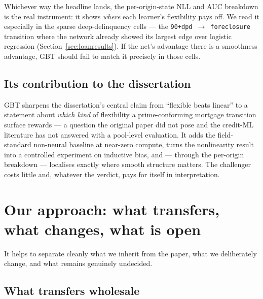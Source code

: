 \documentclass[11pt]{article}
\newcommand{\state}[1]{\texttt{#1}}
\begin{document}
\begin{keyidea}
Whichever way the headline lands, the per-origin-state NLL and AUC breakdown is the real
instrument: it shows \emph{where} each learner's flexibility pays off. We read it especially in
the sparse deep-delinquency cells --- the \state{90+dpd}~$\to$~\state{foreclosure} transition
where the network already showed its largest edge over logistic regression
(Section~\ref{sec:loanresults}). If the net's advantage there is a smoothness advantage, GBT
should fail to match it precisely in those cells.
\end{keyidea}

\subsection{Its contribution to the dissertation}

\begin{intuition}
GBT sharpens the dissertation's central claim from ``flexible beats linear'' to a statement
about \emph{which kind} of flexibility a prime-conforming mortgage transition surface rewards ---
a question the original paper did not pose and the credit-ML literature has not answered with a
pool-level evaluation. It adds the field-standard non-neural baseline at near-zero compute,
turns the nonlinearity result into a controlled experiment on inductive bias, and --- through the
per-origin breakdown --- localises exactly where smooth structure matters. The challenger costs
little and, whatever the verdict, pays for itself in interpretation.
\end{intuition}

\section{Our approach: what transfers, what changes, what is open}
\label{sec:approach}

It helps to separate cleanly what we inherit from the paper, what we deliberately change, and
what remains genuinely undecided.

\subsection{What transfers wholesale}
\end{document}
